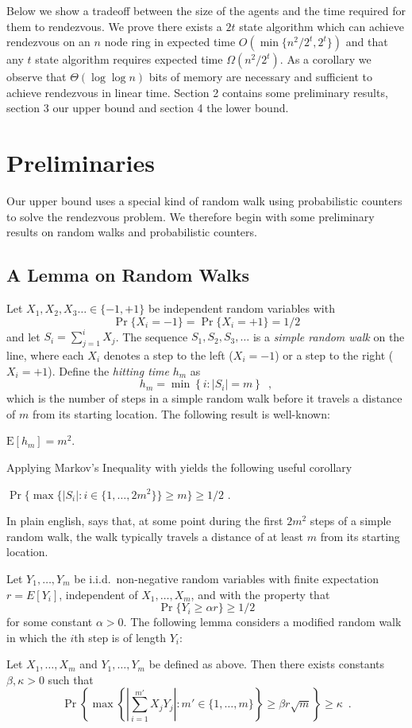 \documentclass[lotsofwhite]{patmorin}
\newcommand{\E}{\mathrm{E}}
\begin{document}
Below we show a tradeoff between the size of the agents and the time
required for them to rendezvous. We prove there exists a $2t$ state
algorithm which can achieve rendezvous on an $n$ node ring in expected
time $O(\min \{ n^2/2^{t}, 2^{t}\} )$ and that any $t$ state algorithm
requires expected time $\Omega( n^2/2^t )$.  As a corollary we observe
that $\Theta(\log \log n)$ bits of memory are necessary and sufficient
to achieve rendezvous in linear time.  Section 2 contains some
preliminary results, section 3 our upper bound and section 4 the lower
bound. 


\section{Preliminaries}

Our upper bound uses a special kind of random walk using probabilistic
counters to solve the rendezvous problem.  We therefore begin with
some preliminary results on random walks and probabilistic counters.

\subsection{A Lemma on Random Walks}

Let $X_1,X_2,X_3\ldots\in\{-1,+1\}$ be independent random variables with
\[ \Pr\{X_i=-1\}=\Pr\{X_i=+1\}=1/2
\]
and let $S_i=\sum_{j=1}^i X_j$.  The sequence $S_1,S_2,S_3,\ldots$ is
a \emph{simple random walk} on the line, where each $X_i$ denotes a
step to the left ($X_i=-1$) or a step to the right ($X_i=+1$).
Define the \emph{hitting time} $h_m$ as
\[
   h_m = \min\left\{i:|S_i|= m\right\} \enspace ,
\]
which is the number of steps in a simple random walk
before it travels a distance of $m$ from its starting location.
The following result is well-known:
\begin{lem}[\cite{X,Y}]
$\E[h_m] = m^2$.
\end{lem}
Applying Markov's Inequality with  yields the
following useful corollary
\begin{cor}
$\Pr\{\max\{|S_i|:i\in\{1,\ldots,2m^2\}\} \ge m\} \ge 1/2$ .
\end{cor}
In plain english,  says that, at some point
during the first $2m^2$ steps of a simple random walk, the walk
typically travels a distance of at least $m$ from its starting
location.

Let $Y_1,\ldots,Y_m$ be i.i.d.\
non-negative random variables with finite expectation $r=E[Y_i]$,
independent of $X_1,\ldots,X_m$, and with the
property that 
\[ \Pr\{Y_i \ge \alpha r\} \ge 1/2 \]
for some constant
$\alpha > 0$.  The following lemma considers a modified random walk in
which the $i$th step is of length $Y_i$:
\begin{lem}
Let $X_1,\ldots,X_m$ and $Y_1,\ldots,Y_m$ be defined as above.  Then
there exists constants $\beta,\kappa>0$ such that
\[
  \Pr\left\{\max\left\{
           \left|\sum_{i=1}^{m'} X_jY_j\right| : m'\in\{1,\ldots,m\}\right\}
            \ge \beta r\sqrt{m}\right\} 
     \ge \kappa \enspace .
\]
\end{lem}
\end{document}
